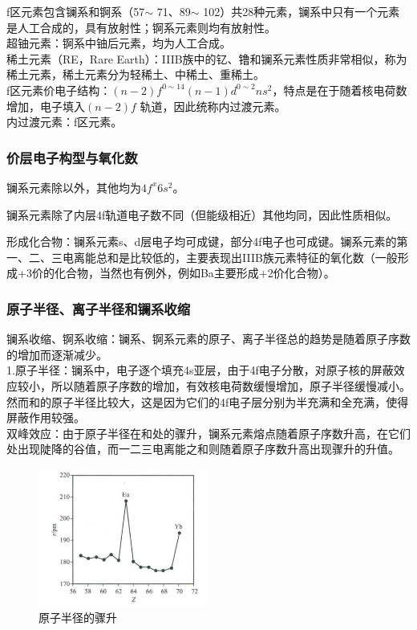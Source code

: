 \documentclass[a4paper,UTF8]{article}
\begin{document}
f区元素包含镧系和锕系（57$\sim$ 71、89$\sim$ 102）共28种元素，镧系中只有一个元素是人工合成的，具有放射性；锕系元素则均有放射性。\\

超铀元素：锕系中铀后元素，均为人工合成。\\

稀土元素（RE，Rare Earth）：IIIB族中的钇、镥和镧系元素性质非常相似，称为稀土元素，稀土元素分为轻稀土、中稀土、重稀土。\\

f区元素价电子结构：$ (n-2)f^{0\sim 14} (n-1)d^{0\sim 2} ns^2 $，特点是在于随着核电荷数增加，电子填入$ (n-2)f $ 轨道，因此统称内过渡元素。\\

内过渡元素：f区元素。\\

\subsubsection{价层电子构型与氧化数}

镧系元素除以外，其他均为$ 4f^x6s^2 $。

镧系元素除了内层4f轨道电子数不同（但能级相近）其他均同，因此性质相似。

形成化合物：镧系元素s、d层电子均可成键，部分4f电子也可成键。镧系元素的第一、二、三电离能总和是比较低的，主要表现出IIIB族元素特征的氧化数（一般形成+3价的化合物，当然也有例外，例如Ba主要形成+2价化合物）。

\subsubsection{原子半径、离子半径和镧系收缩}

镧系收缩、锕系收缩：镧系、锕系元素的原子、离子半径总的趋势是随着原子序数的增加而逐渐减少。\\

1.原子半径：镧系中，电子逐个填充4s亚层，由于4f电子分散，对原子核的屏蔽效应较小，所以随着原子序数的增加，有效核电荷数缓慢增加，原子半径缓慢减小。然而和的原子半径比较大，这是因为它们的4f电子层分别为半充满和全充满，使得屏蔽作用较强。\\

双峰效应：由于原子半径在和处的骤升，镧系元素熔点随着原子序数升高，在它们处出现陡降的谷值，而一二三电离能之和则随着原子序数升高出现骤升的升值。\\

\begin{figure}[htpb]
	\centering
	\includegraphics[width=0.5\textwidth]{figure//双峰效应1.png}
	\caption{原子半径的骤升}
	\label{fig:}
\end{figure}
\end{document}

